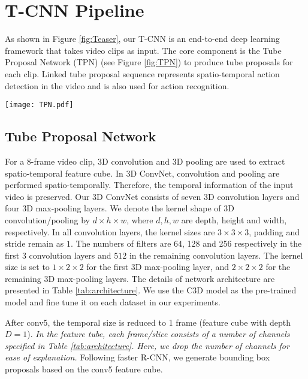 \documentclass[10pt,twocolumn,letterpaper]{article}
\begin{document}
\section{T-CNN Pipeline}
\label{sec:approach}

As shown in Figure \ref{fig:Teaser}, our T-CNN is an end-to-end deep learning framework that takes video clips as input. The core component is the Tube Proposal Network (TPN) (see Figure \ref{fig:TPN}) to produce tube proposals for each clip. Linked tube proposal sequence represents spatio-temporal action detection in the video and is also used for action recognition.

\begin{figure*}[t]
	\centering
	\texttt{[image: TPN.pdf]}
	\caption{Tube proposal network. }
	\label{fig:TPN}
\end{figure*}




\subsection{Tube Proposal Network}
\label{sub-sec: tpn}
For a 8-frame video clip, 3D convolution and 3D pooling are used to extract spatio-temporal feature cube.
In 3D ConvNet, convolution and pooling are performed spatio-temporally. Therefore, the temporal information of the input video is preserved. Our 3D ConvNet consists of seven 3D convolution layers and four 3D max-pooling layers. We denote the kernel shape of 3D convolution/pooling by $d\times h\times w$, where $d, h, w$ are depth, height and width, respectively. In all convolution layers, the kernel sizes are $3\times 3\times 3$, padding and stride remain as $1$. The numbers of filters are 64, 128 and 256 respectively in the first $3$ convolution layers and $512$ in the remaining convolution layers.  The kernel size is set to $1\times 2\times 2$ for the first 3D max-pooling layer, and $2\times 2\times 2$ for the remaining 3D max-pooling layers. The details of network architecture are presented in Table \ref{tab:architecture}.  We use the C3D model \cite{c3d} as the pre-trained model and  fine tune it on each dataset in our experiments.

After conv5, the temporal size is reduced to 1 frame (\ie feature cube with depth $D = 1$). \textit{In the feature tube, each frame/slice consists of a number of channels specified in Table \ref{tab:architecture}. Here, we drop the number of channels for ease of explanation.} Following faster R-CNN, we generate bounding box proposals based on the conv5 feature cube.
\end{document}
